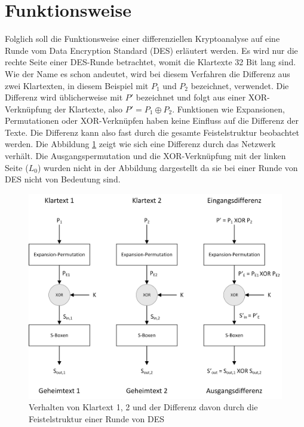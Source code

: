 \clearpage
\section{Funktionsweise}\label{sec:Funktionsweise}
Folglich soll die Funktionsweise einer differenziellen Kryptoanalyse auf eine Runde vom Data Encryption Standard (DES) erläutert werden. Es wird nur die rechte Seite einer DES-Runde betrachtet, womit die Klartexte 32 Bit lang sind. 
Wie der Name es schon andeutet, wird bei diesem Verfahren die Differenz aus zwei Klartexten, in diesem Beispiel mit $P_{1}$ und $P_{2}$ bezeichnet, verwendet. Die Differenz wird üblicherweise mit $P'$ bezeichnet und folgt aus einer XOR-Verknüpfung der Klartexte, also $P' = P_{1} \oplus P_{2}$.
Funktionen wie Expansionen, Permutationen oder XOR-Verknüpfen haben keine Einfluss auf die Differenz der Texte. Die Differenz kann also fast durch die gesamte Feistelstruktur beobachtet werden. Die Abbildung \ref{fig:DES_Differenz} zeigt wie sich eine Differenz durch das Netzwerk verhält. 
Die Ausgangspermutation und die XOR-Verknüpfung mit der linken Seite ($L_{0}$) wurden nicht in der Abbildung dargestellt da sie bei einer Runde von DES nicht von Bedeutung sind.

\begin{figure}[h]
	\centering
	\includegraphics[width=1.0\linewidth]{graphics/DES_Differenz.jpg}
	\caption{Verhalten von Klartext 1, 2 und der Differenz davon durch die Feistelstruktur einer Runde von DES \cite{the_morpheus_tutoials_kryptographie_2016}}
	\label{fig:DES_Differenz}
\end{figure}

